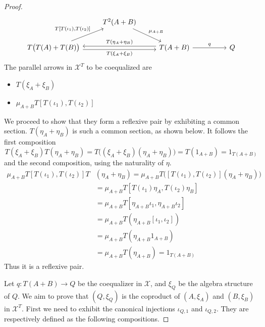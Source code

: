 \begin{subbox}{}
\begin{proof}
\[\begin{tikzcd}
                                                                                                                                                    & T^2(A+B) \arrow[rd, "\mu_{A+B}"]                                &                                                                                                     &  &                           \\
T\bigl( T(A)+T(B)\bigr) \arrow[rr, "{T(\xi_A+\xi_B)}"', shift right] \arrow[ru, "{T[T(\iota_1),T(\iota_2)]}", pos=0.65]                                       &                                                                 & T(A+B) \arrow[ll, "T(\eta_A+\eta_B)"', shift right] \arrow[rr, "q"]                      &  & Q                        
\end{tikzcd}
\]
        The parallel arrows in $\mathcal{X}^T$ to be coequalized are
        \begin{itemize}
            \item $T(\xi_A+\xi_B)$
            \item $\mu_{A+B}T[T(\iota_1),T(\iota_2)]$
        \end{itemize}
        We proceed to show that they form a reflexive pair by exhibiting a common section. $T(\eta_A+\eta_B)$ is such a common section, as shown below. It follows the first composition
        \[T(\xi_A+\xi_B)T(\eta_A+\eta_B)=T\bigl((\xi_A+\xi_B)(\eta_A+\eta_B)\bigr)=T(1_{A+B})=1_{T(A+B)} \]
        and the second composition, using the naturality of $\eta$.
        \begin{align*}
        \mu_{A+B}T[T(\iota_1),T(\iota_2)]T&(\eta_A+\eta_B)=\mu_{A+B}T\bigl([T(\iota_1),T(\iota_2)](\eta_A+\eta_B)\bigr) \\[1.5ex]
        &= \mu_{A+B}T[T(\iota_1)\eta_A,T(\iota_2)\eta_B] \\[1.5ex]
        &= \mu_{A+B}T[\eta_{A+B}\iota_1,\eta_{A+B}\iota_2] \\[1.5ex]
        &= \mu_{A+B}T(\eta_{A+B} [\iota_1,\iota_2]) \\[1.5ex]
        &= \mu_{A+B}T(\eta_{A+B} 1_{A+B}) \\[1.5ex]
        &= \mu_{A+B}T(\eta_{A+B}) = 1_{T(A+B)}
        \end{align*}
        Thus it is a reflexive pair. 
        
        Let $q:T(A+B) \to Q$ be the coequalizer in $\mathcal{X}$, and $\xi_Q$ be the algebra structure of $Q$. We aim to prove that $(Q,\xi_Q)$ is the coproduct of $(A,\xi_A)$ and $(B,\xi_B)$ in $\mathcal{X}^T$. First we need to exhibit the canonical injections $\iota_{Q,1}$ and $\iota_{Q,2}$. They are respectively defined as the following compositions.
        

\end{proof}
\end{subbox}
